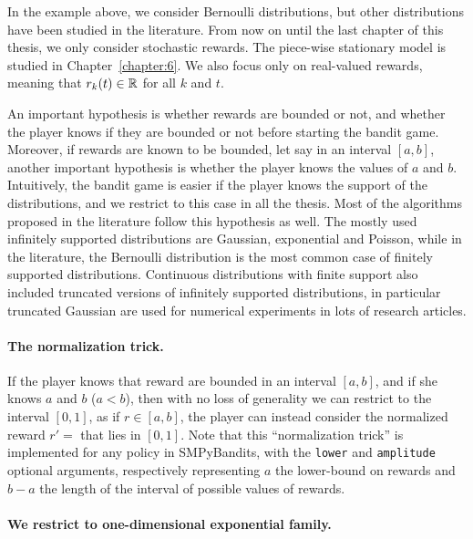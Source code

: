 In the example above, we consider Bernoulli distributions, but other distributions have been studied in the literature.
From now on until the last chapter of this thesis, we only consider stochastic rewards. The piece-wise stationary model is studied in Chapter~\ref{chapter:6}.
%
We also focus only on real-valued rewards, meaning that $r_k(t)\in\mathbb{R}$ for all $k$ and $t$.

An important hypothesis is whether rewards are bounded or not,
and whether the player knows if they are bounded or not before starting the bandit game.
Moreover, if rewards are known to be bounded, let say in an interval $[a,b]$, another important hypothesis is whether the player knows the values of $a$ and $b$.
%
Intuitively, the bandit game is easier if the player knows the support of the distributions, and we restrict to this case in all the thesis.
Most of the algorithms proposed in the literature follow this hypothesis as well.
%
The mostly used
infinitely supported distributions are Gaussian, exponential and Poisson,
while in the literature, the Bernoulli distribution is the most common case of finitely supported distributions.
Continuous distributions with finite support also included truncated versions of infinitely supported distributions, in particular truncated Gaussian are used for numerical experiments in lots of research articles.

\paragraph{The normalization trick.}\label{par:2:normalizationTrick}
%
If the player knows that reward are bounded in an interval $[a,b]$, and if she knows $a$ and $b$ ($a<b$), then with no loss of generality we can restrict to the interval $[0,1]$, as if $r\in[a,b]$, the player can instead consider the normalized reward $r' = $ that lies in $[0,1]$.
Note that this ``normalization trick'' is implemented for any policy in SMPyBandits, with the \texttt{lower} and \texttt{amplitude} optional arguments, respectively representing $a$ the lower-bound on rewards and $b-a$ the length of the interval of possible values of rewards.


\paragraph{We restrict to one-dimensional exponential family.}
%

